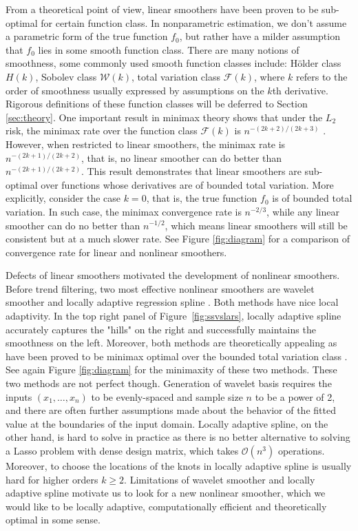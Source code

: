 \documentclass[a4paper]{article}
\renewcommand{\cal}{\mathcal}
\begin{document}
From a theoretical point of view, linear smoothers have been proven to be sub-optimal for certain function class. In nonparametric estimation, we don't assume a parametric form of the true function $f_0$, but rather have a milder assumption that $f_0$ lies in some smooth function class. There are many notions of smoothness, some commonly used smooth function classes include: H\"older class $H(k)$, Sobolev class $\cal{W}(k)$, total variation class $\cal{F}(k)$, where $k$ refers to the order of smoothness usually expressed by assumptions on the $k$th derivative. Rigorous definitions of these function classes will be deferred to Section \ref{sec:theory}. One important result in minimax theory shows that under the $L_2$ risk, the minimax rate over the function class $\cal{F}(k)$ is $n^{-(2k+2)/(2k+3)}$ \cite{donoho1998minimax}. However, when restricted to linear smoothers, the minimax rate is $n^{-(2k+1)/(2k+2)}$, that is, no linear smoother can do better than $n^{-(2k+1)/(2k+2)}$. This result demonstrates that linear smoothers are sub-optimal over functions whose derivatives are of bounded total variation. More explicitly, consider the case $k = 0$, that is, the true function $f_0$ is of bounded total variation. In such case, the minimax convergence rate is $n^{-2/3}$, while any linear smoother can do no better than $n^{-1/2}$, which means linear smoothers will still be consistent but at a much slower rate. See Figure \ref{fig:diagram} for a comparison of convergence rate for linear and nonlinear smoothers.

Defects of linear smoothers motivated the development of nonlinear smoothers. Before trend filtering, two most effective nonlinear smoothers are wavelet smoother \cite{johnstone2011gaussian,mallat2008wavelet,donoho1994ideal} and locally adaptive regression spline \cite{mammen1997locally}. Both methods have nice local adaptivity. In the top right panel of Figure~\ref{fig:ssvslars}, locally adaptive spline accurately captures the "hills" on the right and successfully maintains the smoothness on the left. Moreover, both methods are theoretically appealing as have been proved to be minimax optimal over the bounded total variation class \cite{donoho1998minimax,mammen1997locally}. See again Figure \ref{fig:diagram} for the minimaxity of these two methods. These two methods are not perfect though. Generation of wavelet basis requires the inputs $(x_1, \ldots, x_n)$ to be evenly-spaced and sample size $n$ to be a power of 2, and there are often further assumptions made about the behavior of the fitted value at the boundaries of the input domain. Locally adaptive spline, on the other hand, is hard to solve in practice as there is no better alternative to solving a Lasso problem with dense design matrix, which takes $\cal{O}(n^3)$ operations. Moreover, to choose the locations of the knots in locally adaptive spline is usually hard for higher orders $k\geq 2$. Limitations of wavelet smoother and locally adaptive spline motivate us to look for a new nonlinear smoother, which we would like to be locally adaptive, computationally efficient and theoretically optimal in some sense.
\end{document}
